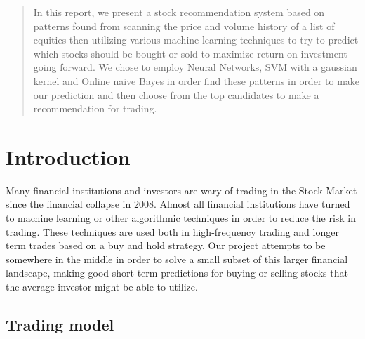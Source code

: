 \documentclass{article}
\begin{document}
 


\begin{abstract} 
In this report, we present a stock recommendation system based on patterns found from scanning the price and volume history of a list of equities then utilizing various machine learning techniques to try to predict which stocks should be bought or sold to maximize return on investment going forward.  We chose to employ Neural Networks, SVM with a gaussian kernel and Online naive Bayes in order find these patterns in order to make our prediction and then choose from the top candidates to make a recommendation for trading.
\end{abstract} 



\section{Introduction}

Many financial institutions and investors are wary of trading in the Stock Market since the financial collapse in 2008.  Almost all financial institutions have turned to machine learning or other algorithmic techniques in order to reduce the risk in trading. These techniques are used both in high-frequency trading and longer term trades based on a buy and hold strategy. Our project attempts to be somewhere in the middle in order to solve a small subset of this larger financial landscape, making good short-term predictions for buying or selling stocks that the average investor might be able to utilize.

\subsection{Trading model}
\end{document}
